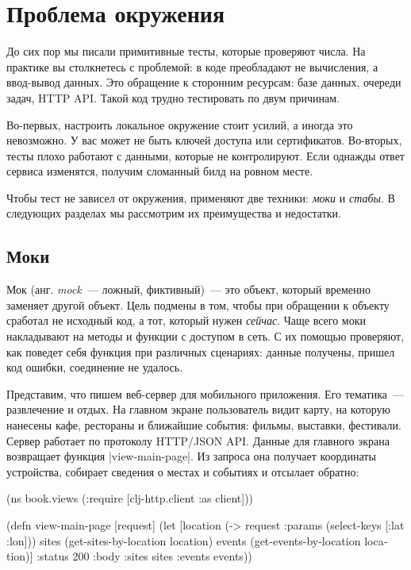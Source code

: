 \section{Проблема окружения}

До сих пор мы писали примитивные тесты, которые проверяют числа. На практике вы
столкнетесь с проблемой: в коде преобладают не вычисления, а ввод-вывод
данных. Это обращение к сторонним ресурсам: базе данных, очереди задач, HTTP
API. Такой код трудно тестировать по двум причинам.

Во-первых, настроить локальное окружение стоит усилий, а иногда это
невозможно. У вас может не быть ключей доступа или сертификатов. Во-вторых,
тесты плохо работают с данными, которые не контролируют. Если однажды ответ
сервиса изменятся, получим сломанный билд на ровном месте.

Чтобы тест не зависел от окружения, применяют две техники: \emph{моки} и
\emph{стабы}. В следующих разделах мы рассмотрим их преимущества и недостатки.

\subsection{Моки}

Мок (анг. \emph{mock}~--- ложный, фиктивный)~--- это объект, который временно
заменяет другой объект. Цель подмены в том, чтобы при обращении к объекту
сработал не исходный код, а тот, который нужен \emph{сейчас}. Чаще всего моки
накладывают на методы и функции с доступом в сеть. С их помощью проверяют, как
поведет себя функция при различных сценариях: данные получены, пришел код
ошибки, соединение не удалось.

Представим, что пишем веб-сервер для мобильного приложения. Его тематика~---
развлечение и отдых. На главном экране пользователь видит карту, на которую
нанесены кафе, рестораны и ближайшие события: фильмы, выставки,
фестивали. Сервер работает по протоколу HTTP/JSON API. Данные для главного
экрана возвращает функция \spverb|view-main-page|. Из запроса она получает
координаты устройства, собирает сведения о местах и событиях и отсылает обратно:

\begin{english}
  \begin{clojure}
(ns book.views
  (:require [clj-http.client :as client]))

(defn view-main-page [request]
  (let [location (-> request :params (select-keys [:lat :lon]))
        sites (get-sites-by-location location)
        events (get-events-by-location location)]
    {:status 200
     :body {:sites sites :events events}}))
  \end{clojure}
\end{english}


